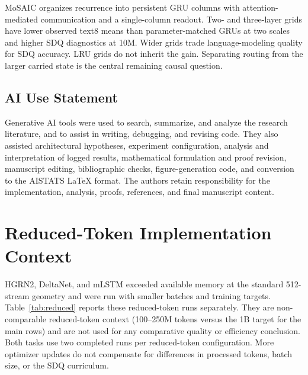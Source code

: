 \documentclass[letterpaper,twoside]{article}
\begin{document}
MoSAIC organizes recurrence into persistent GRU columns with attention-mediated communication and a single-column readout. Two- and three-layer grids have lower observed text8 means than parameter-matched GRUs at two scales and higher SDQ diagnostics at 10M. Wider grids trade language-modeling quality for SDQ accuracy. LRU grids do not inherit the gain. Separating routing from the larger carried state is the central remaining causal question.

\clearpage
\subsection*{AI Use Statement}

Generative AI tools were used to search, summarize, and analyze the research literature, and to assist in writing, debugging, and revising code. They also assisted architectural hypotheses, experiment configuration, analysis and interpretation of logged results, mathematical formulation and proof revision, manuscript editing, bibliographic checks, figure-generation code, and conversion to the AISTATS LaTeX format. The authors retain responsibility for the implementation, analysis, proofs, references, and final manuscript content.



\clearpage


\clearpage
\appendix
\onecolumn
\raggedbottom


\section{Reduced-Token Implementation Context}\label{app:reduced}

HGRN2, DeltaNet, and mLSTM exceeded available memory at the standard 512-stream geometry and were run with smaller batches and training targets. Table~\ref{tab:reduced} reports these reduced-token runs separately. They are non-comparable reduced-token context (100--250M tokens versus the 1B target for the main rows) and are not used for any comparative quality or efficiency conclusion. Both tasks use two completed runs per reduced-token configuration. More optimizer updates do not compensate for differences in processed tokens, batch size, or the SDQ curriculum.
\end{document}
